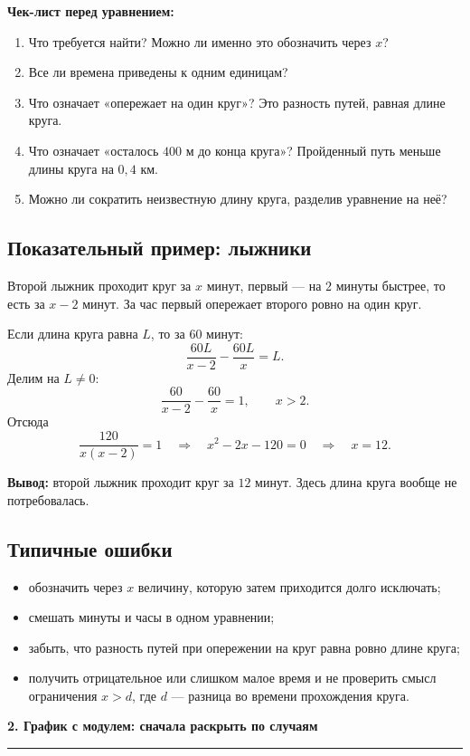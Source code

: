 \documentclass[a4paper,12pt]{article}
\newcommand{\sectiontitle}[1]{%
  \vspace{2mm}%
  {\Large\bfseries\color{darkaccent}#1}\par\vspace{2mm}%
  {\color{accent!55}\rule{\linewidth}{0.6pt}}\par\vspace{2mm}%
}
\newcommand{\keyidea}[1]{\textbf{\color{darkaccent}#1}}
\begin{document}
\textbf{Чек-лист перед уравнением:}
\begin{enumerate}
  \item Что требуется найти? Можно ли именно это обозначить через $x$?
  \item Все ли времена приведены к одним единицам?
  \item Что означает «опережает на один круг»? Это разность путей, равная длине круга.
  \item Что означает «осталось $400$ м до конца круга»? Пройденный путь меньше длины круга на $0{,}4$ км.
  \item Можно ли сократить неизвестную длину круга, разделив уравнение на неё?
\end{enumerate}

\subsection*{Показательный пример: лыжники}
Второй лыжник проходит круг за $x$ минут, первый --- на $2$ минуты быстрее, то есть за $x-2$ минут. За час первый опережает второго ровно на один круг.

Если длина круга равна $L$, то за $60$ минут:
\[
\frac{60L}{x-2}-\frac{60L}{x}=L.
\]
Делим на $L\ne0$:
\[
\frac{60}{x-2}-\frac{60}{x}=1,\qquad x>2.
\]
Отсюда
\[
\frac{120}{x(x-2)}=1
\quad\Longrightarrow\quad
x^2-2x-120=0
\quad\Longrightarrow\quad
x=12.
\]

\keyidea{Вывод:} второй лыжник проходит круг за $12$ минут. Здесь длина круга вообще не потребовалась.

\subsection*{Типичные ошибки}
\begin{itemize}
  \item обозначить через $x$ величину, которую затем приходится долго исключать;
  \item смешать минуты и часы в одном уравнении;
  \item забыть, что разность путей при опережении на круг равна ровно длине круга;
  \item получить отрицательное или слишком малое время и не проверить смысл ограничения $x>d$, где $d$ --- разница во времени прохождения круга.
\end{itemize}

\sectiontitle{2. График с модулем: сначала раскрыть по случаям}
\end{document}

